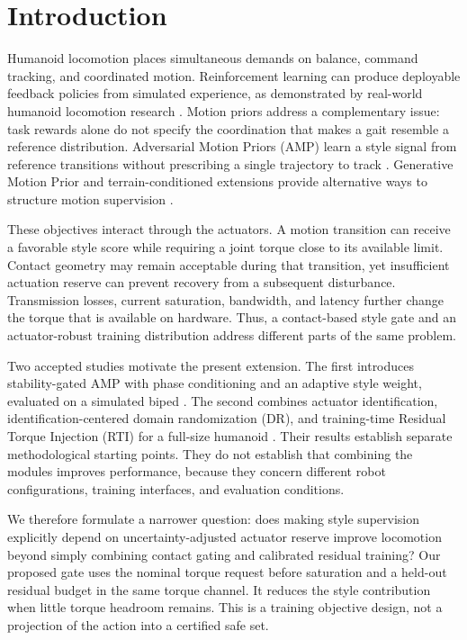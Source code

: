 \documentclass[11pt,a4paper]{article}
\begin{document}
\section{Introduction}
Humanoid locomotion places simultaneous demands on balance, command tracking, and coordinated motion. Reinforcement learning can produce deployable feedback policies from simulated experience, as demonstrated by real-world humanoid locomotion research \cite{realworld}. Motion priors address a complementary issue: task rewards alone do not specify the coordination that makes a gait resemble a reference distribution. Adversarial Motion Priors (AMP) learn a style signal from reference transitions without prescribing a single trajectory to track \cite{amp}. Generative Motion Prior and terrain-conditioned extensions provide alternative ways to structure motion supervision \cite{gmp,tgmp}.

These objectives interact through the actuators. A motion transition can receive a favorable style score while requiring a joint torque close to its available limit. Contact geometry may remain acceptable during that transition, yet insufficient actuation reserve can prevent recovery from a subsequent disturbance. Transmission losses, current saturation, bandwidth, and latency further change the torque that is available on hardware. Thus, a contact-based style gate and an actuator-robust training distribution address different parts of the same problem.

Two accepted studies motivate the present extension. The first introduces stability-gated AMP with phase conditioning and an adaptive style weight, evaluated on a simulated biped \cite{priorSG}. The second combines actuator identification, identification-centered domain randomization (DR), and training-time Residual Torque Injection (RTI) for a full-size humanoid \cite{priorRTI}. Their results establish separate methodological starting points. They do not establish that combining the modules improves performance, because they concern different robot configurations, training interfaces, and evaluation conditions.

We therefore formulate a narrower question: does making style supervision explicitly depend on uncertainty-adjusted actuator reserve improve locomotion beyond simply combining contact gating and calibrated residual training? Our proposed gate uses the nominal torque request before saturation and a held-out residual budget in the same torque channel. It reduces the style contribution when little torque headroom remains. This is a training objective design, not a projection of the action into a certified safe set.
\end{document}
